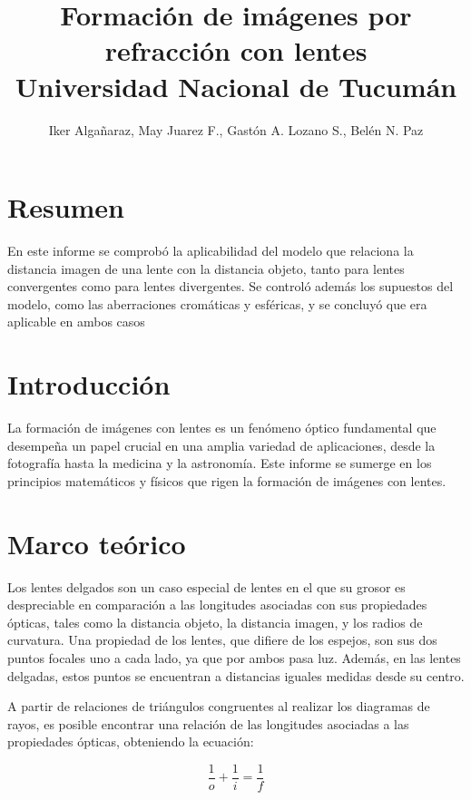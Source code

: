 \documentclass[a4paper,12pt]{article}
\title{Formación de imágenes por refracción con lentes \\ 
\medskip \large Universidad Nacional de Tucumán}
\author{Iker Algañaraz, May Juarez F., Gastón A. Lozano S., Belén N. Paz}
\date{}
\begin{document}
\maketitle

\section*{Resumen}

    En este informe se comprobó la aplicabilidad del modelo que relaciona la distancia imagen de una lente con la distancia objeto, tanto para lentes convergentes como para lentes divergentes. Se controló además los supuestos del modelo, como las aberraciones cromáticas y esféricas, y se concluyó que era aplicable en ambos casos

\medskip

\begin{multicols*}{2}

\section*{Introducción}

    La formación de imágenes con lentes es un fenómeno óptico fundamental que desempeña un papel crucial en una amplia variedad de aplicaciones, desde la fotografía hasta la medicina y la astronomía. Este informe se sumerge en los principios matemáticos y físicos que rigen la formación de imágenes con lentes.

\section*{Marco teórico}

    Los lentes delgados son un caso especial de lentes en el que su grosor es despreciable en comparación a las longitudes asociadas con sus propiedades ópticas, tales como la distancia objeto, la distancia imagen, y los radios de curvatura. Una propiedad de los lentes, que difiere de los espejos, son sus dos puntos focales uno a cada lado, ya que por ambos pasa luz. Además, en las lentes delgadas, estos puntos se encuentran a distancias iguales medidas desde su centro.

    A partir de relaciones de triángulos congruentes al realizar los diagramas de rayos, es posible encontrar una relación de las longitudes asociadas a las propiedades ópticas, obteniendo la ecuación:
    
    \begin{equation} 
        \label{eq:1/i+1/o}
        \frac{1}{o}+\frac{1}{i}=\frac{1}{f}
    \end{equation}


\end{multicols*}
\end{document}
